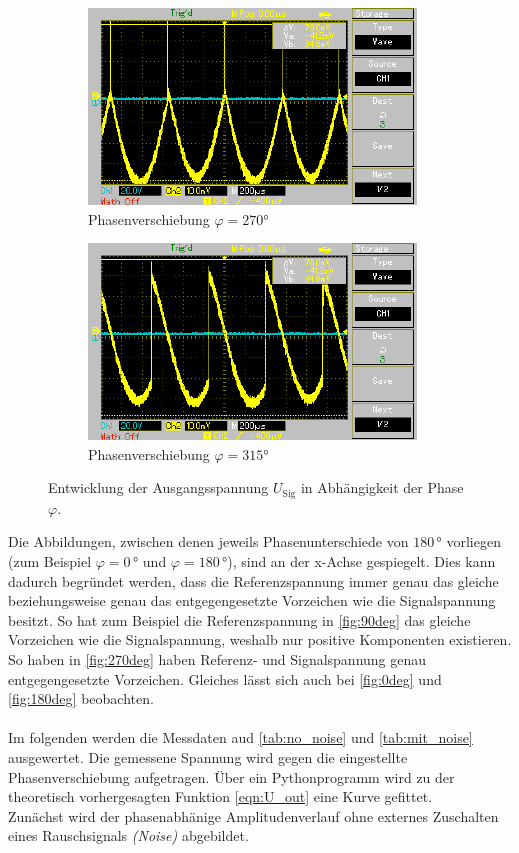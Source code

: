 \begin{figure}
\begin{subfigure}{0.48\textwidth}
        \centering
        \includegraphics{./content/Oszilloskop_270.pdf}
        \caption{Phasenverschiebung $\varphi = 270°$}
        \label{fig:270deg}
    \end{subfigure}
    \hfill
    \begin{subfigure}{0.48\textwidth}
        \centering
        \includegraphics{./content/Oszilloskop_315.pdf}
        \caption{Phasenverschiebung $\varphi = 315°$}
        \label{fig:315deg}
    \end{subfigure}    
\caption{Entwicklung der Ausgangsspannung $U_\text{Sig}$ in Abhängigkeit der Phase $\varphi$.}
\end{figure}

\noindent
Die Abbildungen, zwischen denen jeweils Phasenunterschiede von $180\,\unit{\degree}$ vorliegen (zum Beispiel $\varphi = 0\,\unit{\degree}$ und $\varphi = 180\,\unit{\degree}$), 
sind an der x-Achse gespiegelt. Dies kann dadurch begründet werden, dass die
Referenzspannung immer genau das gleiche beziehungsweise genau das entgegengesetzte Vorzeichen wie die 
Signalspannung besitzt. So hat zum Beispiel die Referenzspannung in \autoref{fig:90deg} das gleiche Vorzeichen wie die 
Signalspannung, weshalb nur positive Komponenten existieren. So haben in \autoref{fig:270deg} haben Referenz- und 
Signalspannung genau entgegengesetzte Vorzeichen.
Gleiches lässt sich auch bei \autoref{fig:0deg} und \autoref{fig:180deg} beobachten.\\\\
\noindent
Im folgenden werden die Messdaten aud \autoref{tab:no_noise} und \autoref{tab:mit_noise} ausgewertet. Die gemessene 
Spannung wird gegen die eingestellte Phasenverschiebung aufgetragen. Über ein Pythonprogramm wird zu der 
theoretisch vorhergesagten Funktion \eqref{eqn:U_out} eine Kurve gefittet.\\
Zunächst wird der phasenabhänige Amplitudenverlauf ohne externes Zuschalten eines Rauschsignals \emph{(Noise)} abgebildet.

